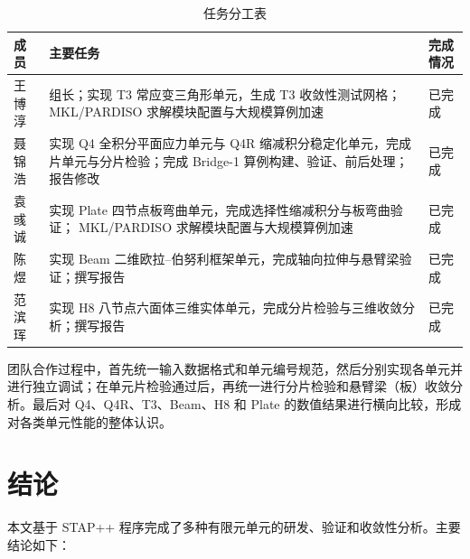 \documentclass[UTF8,a4paper,zihao=-4]{ctexart}
\begin{document}
\begin{table}[H]
    \centering
    \caption{任务分工表}
    \label{tab:division}
    \begin{tabular}{p{}p{}p{}}
        \toprule
        成员 & 主要任务 & 完成情况\\
        \midrule
        王博淳 & 组长；实现 T3 常应变三角形单元，生成 T3 收敛性测试网格； MKL/PARDISO 求解模块配置与大规模算例加速 & 已完成\\
        聂锦浩 & 实现 Q4 全积分平面应力单元与 Q4R 缩减积分稳定化单元，完成片单元与分片检验；完成 Bridge-1 算例构建、验证、前后处理；报告修改 & 已完成\\
        袁彧诚 & 实现 Plate 四节点板弯曲单元，完成选择性缩减积分与板弯曲验证； MKL/PARDISO 求解模块配置与大规模算例加速 & 已完成\\
        陈 煜 & 实现 Beam 二维欧拉--伯努利框架单元，完成轴向拉伸与悬臂梁验证；撰写报告 & 已完成\\
        范滨珲 & 实现 H8 八节点六面体三维实体单元，完成分片检验与三维收敛分析；撰写报告 & 已完成\\
        \bottomrule
    \end{tabular}
\end{table}

团队合作过程中，首先统一输入数据格式和单元编号规范，然后分别实现各单元并进行独立调试；在单元片检验通过后，再统一进行分片检验和悬臂梁（板）收敛分析。最后对 Q4、Q4R、T3、Beam、H8 和 Plate 的数值结果进行横向比较，形成对各类单元性能的整体认识。

\section{结论}

本文基于 STAP++ 程序完成了多种有限元单元的研发、验证和收敛性分析。主要结论如下：
\end{document}
